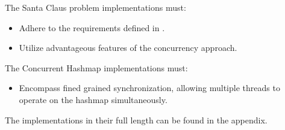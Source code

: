 The Santa Claus problem implementations must:
\begin{itemize}
	\item Adhere to the requirements defined in .
	\item Utilize advantageous features of the concurrency approach.
\end{itemize}

The Concurrent Hashmap implementations must:
\begin{itemize}
	\item Encompass fined grained synchronization, allowing multiple threads to operate on the hashmap simultaneously.
\end{itemize}
The implementations in their full length can be found in the appendix.
\worksheetend
